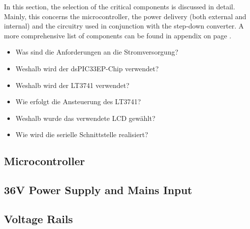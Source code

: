 In this  section, the  selection of  the critical  components is  discussed in
detail. Mainly, this  concerns the  microcontroller, the power  delivery (both
external  and  internal)  and  the  circuitry used  in  conjunction  with  the
step-down converter. A more  comprehensive list of components can  be found in
appendix  on page .

\begin{itemize}
    \item
        Was sind die Anforderungen an die Stromversorgung?
    \item
        Weshalb wird der dsPIC33EP-Chip verwendet?
    \item
        Weshalb wird der LT3741 verwendet?
    \item
        Wie erfolgt die Ansteuerung des LT3741?
    \item
        Weshalb wurde das verwendete LCD gew\"ahlt?
    \item
        Wie wird die serielle Schnittstelle realisiert?
\end{itemize}

\subsection{Microcontroller}



\subsection{36V Power Supply and Mains Input}



\subsection{Voltage Rails}




